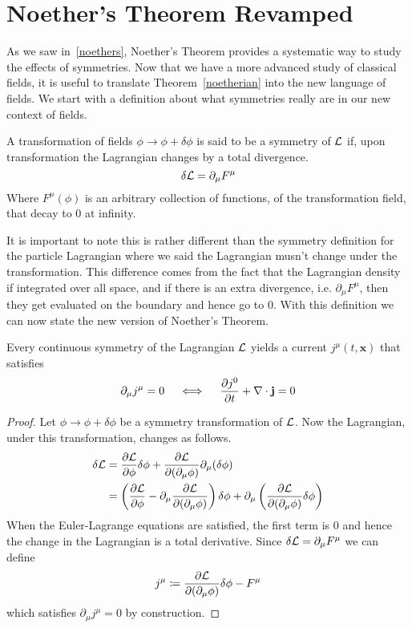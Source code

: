 \section{Noether's Theorem Revamped}\label{noether2}
As we saw in~\ref{noethers}, Noether's Theorem provides a systematic way to
study the effects of symmetries. Now that we have a more advanced study of
classical fields, it is useful to translate Theorem~\ref{noetherian} into the
new language of fields. We start with a definition about what symmetries really
are in our new context of fields.
\begin{definition}
    A transformation of fields \(\phi\to\phi + \delta\phi\) is said to be a
symmetry of \(\mathcal{L}\) if, upon transformation the Lagrangian changes by a total
divergence.
    \begin{equation}
        \delta\mathcal{L} = \partial_\mu F^\mu
    \end{equation}
    Where \(F^\mu(\phi)\) is an arbitrary collection of functions, of the
transformation field, that decay to 0 at infinity.
\end{definition}
It is important to note this is rather different than the symmetry definition
for the particle Lagrangian where we said the Lagrangian musn't change under the
transformation. This difference comes from the fact that the Lagrangian density
if integrated over all space, and if there is an extra divergence, i.e.
\(\partial_\mu F^\mu\), then they get evaluated on the boundary and hence go to
0. With this definition we can now state the new version of Noether's Theorem.
\begin{theorem}\label{noetherfield}
    Every continuous symmetry of the Lagrangian \(\mathcal{L}\) yields a current \(j^\mu(t,\mathbf{x})\) that satisfies
    \begin{equation}\label{eq:conscurrent}
        \partial_\mu j^\mu = 0 \quad \iff \quad \pdv{j^0}{t} + \nabla\cdot\mathbf{j} = 0
    \end{equation}
\end{theorem}
\begin{proof}
    Let \(\phi\to\phi + \delta\phi\) be a symmetry transformation of \(\mathcal{L}\).
Now the Lagrangian, under this transformation, changes as follows.
    \begin{align}
        \delta\mathcal{L} & = \pdv{\mathcal{L}}{\phi}\delta\phi + \pdv{\mathcal{L}}{(\partial_\mu\phi)}\partial_\mu(\delta\phi) \\
                   & = \left(\pdv{\mathcal{L}}{\phi} - \partial_\mu\pdv{\mathcal{L}}{(\partial_\mu\phi)}\right)\delta\phi + \partial_\mu\left(\pdv{\mathcal{L}}{(\partial_\mu\phi)}\delta\phi\right)
    \end{align}
    When the Euler-Lagrange equations are satisfied, the first term is 0 and
hence the change in the Lagrangian is a total derivative. Since
\(\delta\mathcal{L} = \partial_\mu F^\mu\) we can define
    \begin{equation}
        j^\mu\coloneqq \pdv{\mathcal{L}}{(\partial_\mu\phi)}\delta\phi - F^\mu
    \end{equation}
    which satisfies \(\partial_\mu j^\mu = 0\) by construction.
\end{proof}

